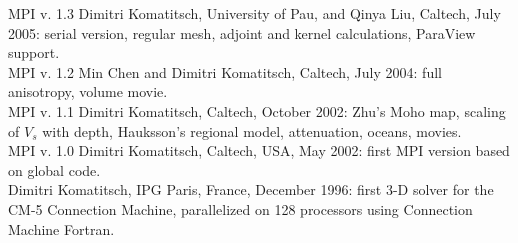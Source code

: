 MPI v. 1.3 Dimitri Komatitsch, University of Pau, and Qinya Liu, Caltech,
July 2005: serial version, regular mesh, adjoint and kernel calculations,
ParaView support.\\


MPI v. 1.2 Min Chen and Dimitri Komatitsch, Caltech, July 2004: full
anisotropy, volume movie.\\


MPI v. 1.1 Dimitri Komatitsch, Caltech, October 2002: Zhu's Moho map,
scaling of $V_{s}$ with depth, Hauksson's regional model, attenuation,
oceans, movies.\\


MPI v. 1.0 Dimitri Komatitsch, Caltech, USA, May 2002: first MPI version
based on global code.\\


Dimitri Komatitsch, IPG Paris, France, December 1996: first 3-D solver
for the CM-5 Connection Machine, parallelized on 128 processors using
Connection Machine Fortran.\\


